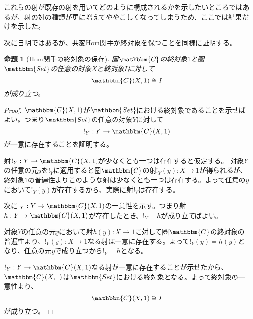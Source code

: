 \documentclass[uplatex,dvipdfmx]{jsarticle}
\newcommand{\cat}[1]{\mathbbm{#1}}
\newcommand{\arrow}{\rightarrow}
\newcommand{\mor}[3]{#1:#2\arrow #3}
\newcommand{\arset}[3]{\cat{#1}(#2,#3)}
\newtheorem{proof}{証明}[section]
\newtheorem{prop}[proof]{命題}
\numberwithin{proof}{subsection}
\begin{document}
  これらの射が既存の射を用いてどのように構成されるかを示したいところではあるが、射の対の種類が更に増えてややこしくなってしまうため、ここでは結果だけを示した。

	次に自明ではあるが、共変Hom関手が終対象を保つことを同様に証明する。
	\begin{prop}[Hom関手の終対象の保存]
		圏$\cat{C}$の終対象$1$と圏$\cat{Set}$の任意の対象$X$と終対象$I$に対して\[\arset{C}{X}{1}\cong I\]が成り立つ。
	\end{prop}
	\begin{proof}
		$\arset{C}{X}{1}$が$\cat{Set}$における終対象であることを示せばよい。つまり$\cat{Set}$の任意の対象$Y$に対して\[\mor{!_Y}{Y}{\arset{C}{X}{1}}\]が一意に存在することを証明する。

		射$\mor{!_Y}{Y}{\arset{C}{X}{1}}$が少なくとも一つは存在すると仮定する。
		対象$Y$の任意の元$y$を$!_Y$に適用すると圏$\cat{C}$の射$\mor{!_Y(y)}{X}{1}$が得られるが、終対象$1$の普遍性よりこのような射は少なくとも一つは存在する。よって任意の$y$において$!_Y(y)$が存在するから、実際に射$!_Y$は存在する。
		\begin{center}
		\end{center}
		次に$\mor{!_Y}{Y}{\arset{C}{X}{1}}$の一意性を示す。つまり射$\mor{h}{Y}{\arset{C}{X}{1}}$が存在したとき、$!_Y=h$が成り立てばよい。

		対象$Y$の任意の元$y$において射$\mor{h(y)}{X}{1}$に対して圏$\cat{C}$の終対象の普遍性より、$\mor{!_Y(y)}{X}{1}$なる射は一意に存在する。よって$!_Y(y)=h(y)$となり、任意の元$y$で成り立つから$!_Y=h$となる。

		\begin{center}
		\end{center}
		$\mor{!_Y}{Y}{\arset{C}{X}{1}}$なる射が一意に存在することが示せたから、$\arset{C}{X}{1}$は$\cat{Set}$における終対象となる。よって終対象の一意性より、\[\arset{C}{X}{1}\cong I\]が成り立つ。
	\end{proof}
\end{document}
